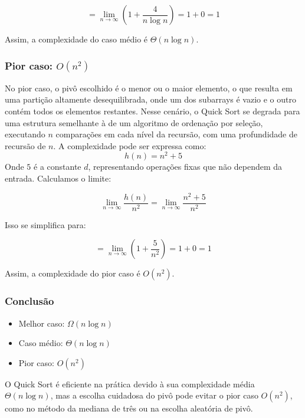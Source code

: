 \[
= \lim_{n \to \infty} \left(1 + \frac{4}{n \log n}\right) = 1 + 0 = 1
\]

Assim, a complexidade do caso médio é \(\Theta(n \log n)\).

\subsubsection{Pior caso: \(O(n^2)\)}
No pior caso, o pivô escolhido é o menor ou o maior elemento, o que resulta em uma partição altamente desequilibrada, onde um dos subarrays é vazio e o outro contém todos os elementos restantes. Nesse cenário, o Quick Sort se degrada para uma estrutura semelhante à de um algoritmo de ordenação por seleção, executando \(n\) comparações em cada nível da recursão, com uma profundidade de recursão de \(n\). A complexidade pode ser expressa como:
\[
h(n) = n^2 + 5
\]
Onde \(5\) é a constante \(d\), representando operações fixas que não dependem da entrada. Calculamos o limite:

\[
\lim_{n \to \infty} \frac{h(n)}{n^2} = \lim_{n \to \infty} \frac{n^2 + 5}{n^2}
\]

Isso se simplifica para:

\[
= \lim_{n \to \infty} \left(1 + \frac{5}{n^2}\right) = 1 + 0 = 1
\]

Assim, a complexidade do pior caso é \(O(n^2)\).

\subsubsection{Conclusão}
\begin{itemize}
  \item Melhor caso: \(\Omega(n \log n)\)
  \item Caso médio: \(\Theta(n \log n)\)
  \item Pior caso: \(O(n^2)\)
\end{itemize}
O Quick Sort é eficiente na prática devido à sua complexidade média \(\Theta(n \log n)\), mas a escolha cuidadosa do pivô pode evitar o pior caso \(O(n^2)\), como no método da mediana de três ou na escolha aleatória de pivô.